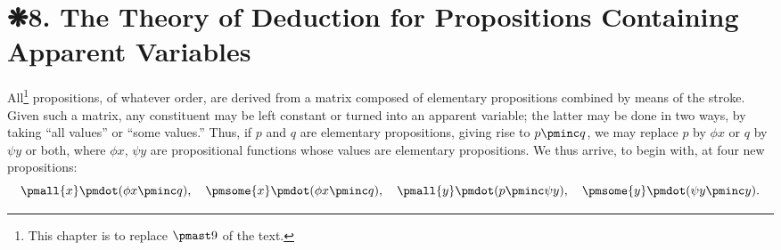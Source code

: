 	
	
	
\chapter*{❋8. The Theory of Deduction for Propositions Containing Apparent Variables} 
 All\footnote{This chapter is to replace \(\pmast9\) of the text.} propositions, of whatever order, are derived from a matrix composed of elementary propositions combined by means of the stroke. Given such a matrix, any constituent may be left constant or turned into an apparent variable; the latter may be done in two ways, by taking ``all values'' or ``some values.'' Thus, if \(p\) and \(q\) are elementary propositions, giving rise to \(p \pminc q\), we may replace \(p\) by \(\phi x\) or \(q\) by \(\psi y\) or both, where \(\phi x\), \(\psi y\) are propositional functions whose values are elementary propositions. We thus arrive, to begin with, at four new propositions:
\[ \pmall{x} \pmdot (\phi x \pminc q),  \quad \pmsome{x} \pmdot (\phi x \pminc q), \quad \pmall{y} \pmdot (p \pminc \psi y), \quad \pmsome{y} \pmdot (\psi y \pminc y) .\]

